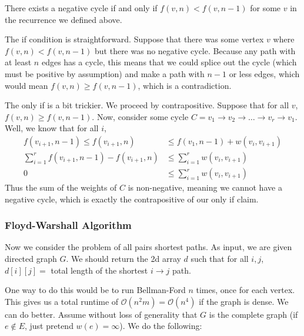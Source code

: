 \begin{theorem}
    There exists a negative cycle if and only if $f(v, n) < f(v, n - 1)$ for some $v$ in the recurrence we defined above.

    \begin{proof*}
        The if condition is straightforward. Suppose that there was some vertex $v$ where $f(v, n) < f(v, n- 1)$ but there was no negative cycle.
        Because any path with at least $n$ edges has a cycle,
        this means that we could splice out the cycle (which must be positive by assumption) and
        make a path with $n - 1$ or less edges, which would mean $f(v, n) \geq f(v, n - 1)$,
        which is a contradiction.

        The only if is a bit trickier. We proceed by contrapositive. Suppose that for all $v$, $f(v, n) \geq f(v, n - 1)$.
        Now, consider some cycle $C = v_1 \to v_2 \to \dots \to v_r \to v_1$. Well, we know that for all $i$,
        \begin{align*}
            f(v_{i + 1}, n - 1) \leq f(v_{i + 1}, n) &\leq f(v_1, n - 1) + w(v_i, v_{i + 1}) \\
            \sum_{i = 1}^r f(v_{i + 1}, n- 1) - f(v_{i + 1}, n) &\leq \sum_{i = 1}^r w(v_i, v_{i + 1}) \\
            0 &\leq \sum_{i = 1}^r w(v_i, v_{i + 1})
        \end{align*}
        Thus the sum of the weights of $C$ is non-negative, meaning we cannot have a negative cycle, which is exactly the contrapositive
        of our only if claim.
    \end{proof*}
\end{theorem}

\subsubsection{Floyd-Warshall Algorithm}
Now we consider the problem of all pairs shortest paths. As input, we are given directed graph $G$. We should return the 2d array
$d$ such that for all $i,j$, $d[i][j] =$ total length of the shortest $i \to j$ path.

One way to do this would be to run Bellman-Ford $n$ times, once for each vertex. This gives us a total runtime of
$\mathcal{O}(n^2 m) = \mathcal{O}(n^4)$ if the graph is dense. We can do better. Assume without loss of generality that $G$ is the complete graph (if $e \notin E$, just 
pretend $w(e) = \infty$). We do the following:


